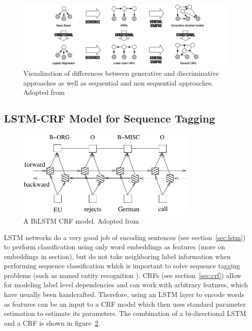 
\begin{figure}
	\includegraphics[width=\textwidth]{different_markovs.png}
	\caption{Visualization of differences between generative and discriminative approaches
	as well as sequential and non sequential approaches.
	Adopted from \citep{sutton2012introduction}}
	\label{fig:different_graphicals}
\end{figure}



\subsection{LSTM-CRF Model for Sequence Tagging}

\begin{figure}
	\includegraphics[width=0.8\textwidth]{biLstmCRF.pdf}
	\caption{A BiLSTM CRF model. Adopted from 
	\citep{huang2015bidirectional}
	}
	\label{fig:bilstm_crf}
\end{figure}


LSTM networks do a very good job of encoding sentences
(see section~\ref{sec:lstm}) to perform classification using only 
word embeddings as features (more on embeddings in section),
but do not take neighboring label information when performing sequence
classification which is important to solve sequence tagging
problems (such as named entity recognition \citep{nadeau2007survey}).
CRFs (see section~\ref{sec:crf}) allow for modeling label level 
dependencies and can work with arbitrary features, which have usually been
handcrafted.
Therefore, using an LSTM layer to encode words as features can be an input to a
CRF model which then uses standard 
parameter estimation to estimate its parameters. 
The combination of a bi-directional LSTM and a CRF is shown in figure~\ref{fig:bilstm_crf}.

